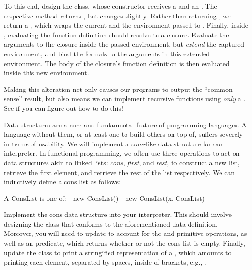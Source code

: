 To this end, design the  class, whose constructor receives a  and an . The respective  method returns , but  changes slightly. Rather than returning , we return a , which wraps the current  and the environment passed to . Finally, inside , evaluating the function definition should resolve to a closure. Evaluate the arguments to the closure inside the passed environment, but \textit{extend} the captured environment, and bind the formals to the arguments in this extended environment. The body of the closure's function definition is then evaluated inside this new environment. 

Making this alteration not only causes our programs to output the ``common sense'' result, but also means we can implement recursive functions using \textit{only} a . See if you can figure out how to do this!

Data structures are a core and fundamental feature of programming languages. A language without them, or at least one to build others on top of, suffers severely in terms of usability. We will implement a \emph{cons}-like data structure for our interpreter. In functional programming, we often use three operations to act on data structures akin to linked lists: \emph{cons}, \emph{first}, and \emph{rest}, to construct a new list, retrieve the first element, and retrieve the rest of the list respectively. We can inductively define a cons list as follows:

\begin{verbnobox}[\small]
A ConsList is one of:
 - new ConsList()
 - new ConsList(x, ConsList)
\end{verbnobox}

Implement the cons data structure into your interpreter. This should involve designing the  class that conforms to the aforementioned data definition. Moreover, you will need to update  to account for the  and  primitive operations, as well as an  predicate, which returns whether or not the cons list is empty. Finally, update the  class to print a stringified representation of a , which amounts to printing each element, separated by spaces, inside of brackets, e.g., \ttt{[$l_0, l_1, ..., l_{n-1}]$}.

